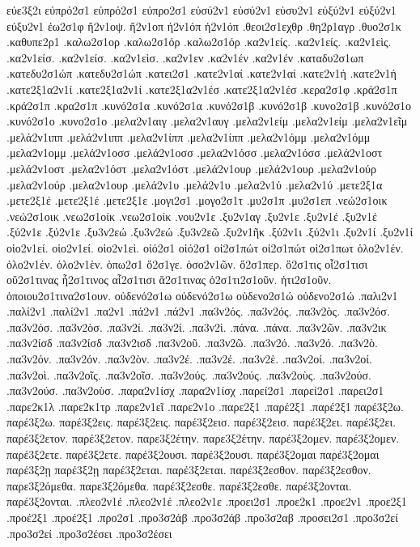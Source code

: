 {εὐε3ξ2ι
εὐπρό2σ1  εὐπρό2σ1
εὐπρο2σ1
εὐσύ2ν1  εὐσύ2ν1
εὐσυ2ν1
εὐξύ2ν1  εὐξύ2ν1
εὐξυ2ν1
ἐω2σ1φ
ἤ2ν1οψ.
ἤ2ν1οπ
ἠ2ν1όπ  ἠ2ν1όπ
.θεοι2σ1εχθρ
.θη2ρ1αγρ
.θυο2σ1κ
.καθυπε2ρ1
.καλω2σ1ορ
.καλω2σ1όρ  .καλω2σ1όρ
.κα2ν1είς.  .κα2ν1είς.
.κα2ν1εὶς.
.κα2ν1είσ.  .κα2ν1είσ.
.κα2ν1εὶσ.
.κα2ν1εν
.κα2ν1έν  .κα2ν1έν
.καταδυ2σ1ωπ
.κατεδυ2σ1ώπ  .κατεδυ2σ1ώπ
.κατει2σ1
.κατε2ν1αί  .κατε2ν1αί
.κατε2ν1ή  .κατε2ν1ή
.κατε2ξ1α2ν1ί  .κατε2ξ1α2ν1ί
.κατε2ξ1α2ν1έσ  .κατε2ξ1α2ν1έσ
.κερα2σ1φ
.κρά2σ1π  .κρά2σ1π
.κρα2σ1π
.κυνό2σ1α  .κυνό2σ1α
.κυνό2σ1β  .κυνό2σ1β
.κυνο2σ1β
.κυνό2σ1ο  .κυνό2σ1ο
.κυνο2σ1ο
.μελα2ν1αιγ
.μελα2ν1αυγ
.μελα2ν1είμ  .μελα2ν1είμ
.μελα2ν1εῖμ
.μελά2ν1ιππ  .μελά2ν1ιππ
.μελα2ν1ίππ  .μελα2ν1ίππ
.μελα2ν1όμμ  .μελα2ν1όμμ
.μελα2ν1ομμ
.μελά2ν1οσσ  .μελά2ν1οσσ
.μελα2ν1όσσ  .μελα2ν1όσσ
.μελά2ν1οστ  .μελά2ν1οστ
.μελα2ν1όστ  .μελα2ν1όστ
.μελά2ν1ουρ  .μελά2ν1ουρ
.μελα2ν1ούρ  .μελα2ν1ούρ
.μελα2ν1ουρ
.μελά2ν1υ  .μελά2ν1υ
.μελα2ν1ύ  .μελα2ν1ύ
.μετε2ξ1α
.μετε2ξ1έ  .μετε2ξ1έ
.μετε2ξ1ε
.μογι2σ1
.μογο2σ1τ
.μυ2σ1π
.μυ2σ1επ
.νεώ2σ1οικ  .νεώ2σ1οικ
.νεω2σ1οίκ  .νεω2σ1οίκ
.νου2ν1ε
.ξυ2ν1αγ
.ξυ2ν1ε
.ξυ2ν1έ  .ξυ2ν1έ
.ξύ2ν1ε  .ξύ2ν1ε
.ξυ3ν2εώ  .ξυ3ν2εώ
.ξυ3ν2εῶ
.ξυ2ν1ῆκ
.ξύ2ν1ι  .ξύ2ν1ι
.ξυ2ν1ί  .ξυ2ν1ί
οἱο2ν1εί.  οἱο2ν1εί.
οἱο2ν1εὶ.
οἱό2σ1  οἱό2σ1
οἰ2σ1πώτ  οἰ2σ1πώτ
οἰ2σ1πωτ
ὁλο2ν1έν.  ὁλο2ν1έν.
ὁλο2ν1ὲν.
ὁπω2σ1
ὅ2σ1γε.
ὁσο2ν1ῶν.
ὅ2σ1περ.
ὅ2σ1τις
οἷ2σ1τισι
οὕ2σ1τινας
ἧ2σ1τινος
αἷ2σ1τισι
ἅ2σ1τινας
ὁ2σ1τι2σ1οῦν.
ἡτι2σ1οῦν.
ὁποιου2σ1τινα2σ1ουν.
οὐδενό2σ1ω  οὐδενό2σ1ω
οὐδενο2σ1ώ  οὐδενο2σ1ώ
.παλι2ν1
.παλί2ν1  .παλί2ν1
.πα2ν1
.πά2ν1  .πά2ν1
.πα3ν2ός.  .πα3ν2ός.
.πα3ν2ὸς.
.πα3ν2όσ.  .πα3ν2όσ.
.πα3ν2ὸσ.
.πα3ν2ί.  .πα3ν2ί.
.πα3ν2ὶ.
.πάνα.  .πάνα.
.πα3ν2ῶν.
.πα3ν2ικ
.πα3ν2ίσδ  .πα3ν2ίσδ
.πα3ν2ισδ
.πα3ν2οῦ.
.πα3ν2ῶ.
.πα3ν2ό.  .πα3ν2ό.
.πα3ν2ὸ.
.πα3ν2όν.  .πα3ν2όν.
.πα3ν2ὸν.
.πα3ν2έ.  .πα3ν2έ.
.πα3ν2ὲ.
.πα3ν2οί.  .πα3ν2οί.
.πα3ν2οὶ.
.πα3ν2οῖς.
.πα3ν2οῖσ.
.πα3ν2ούς.  .πα3ν2ούς.
.πα3ν2οὺς.
.πα3ν2ούσ.  .πα3ν2ούσ.
.πα3ν2οὺσ.
.παρα2ν1ίσχ  .παρα2ν1ίσχ
.παρεί2σ1  .παρεί2σ1
.παρει2σ1
.παρε2κ1λ
.παρε2κ1τρ
.παρε2ν1εῖ
.παρε2ν1ο
.παρε2ξ1
.παρέ2ξ1  .παρέ2ξ1
παρέ3ξ2ω.  παρέ3ξ2ω.
παρέ3ξ2εις.  παρέ3ξ2εις.
παρέ3ξ2εισ.  παρέ3ξ2εισ.
παρέ3ξ2ει.  παρέ3ξ2ει.
παρέ3ξ2ετον.  παρέ3ξ2ετον.
παρε3ξ2έτην.  παρε3ξ2έτην.
παρέ3ξ2ομεν.  παρέ3ξ2ομεν.
παρέ3ξ2ετε.  παρέ3ξ2ετε.
παρέ3ξ2ουσι.  παρέ3ξ2ουσι.
παρέ3ξ2ομαι  παρέ3ξ2ομαι
παρέ3ξ2ῃ  παρέ3ξ2ῃ
παρέ3ξ2εται.  παρέ3ξ2εται.
παρέ3ξ2εσθον.  παρέ3ξ2εσθον.
παρε3ξ2όμεθα.  παρε3ξ2όμεθα.
παρέ3ξ2εσθε.  παρέ3ξ2εσθε.
παρέ3ξ2ονται.  παρέ3ξ2ονται.
.πλεο2ν1έ  .πλεο2ν1έ
.πλεο2ν1ε
.προει2σ1
.προε2κ1
.προε2ν1
.προε2ξ1
.προέ2ξ1  .προέ2ξ1
.προ2σ1
.προ3σ2άβ  .προ3σ2άβ
.προ3σ2αβ
.προσει2σ1
.προ3σ2εί  .προ3σ2εί
.προ3σ2έσει  .προ3σ2έσει
}
